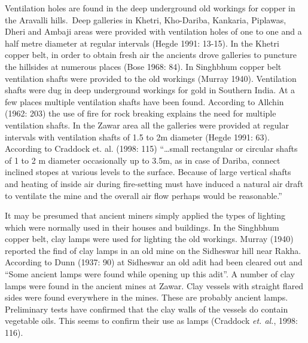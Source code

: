 Ventilation holes are found in the deep underground old workings for copper in the Aravalli hills.~Deep galleries in Khetri, Kho-Dariba, Kankaria, Piplawas, Dheri and Ambaji areas were provided with ventilation holes of one to one and a half metre diameter at regular intervals (Hegde 1991: 13-15). In the Khetri copper belt, in order to obtain fresh air the ancients drove galleries to puncture the hillsides at numerous places (Bose 1968: 84). In Singhbhum copper belt ventilation shafts were provided to the old workings (Murray 1940). Ventilation shafts were dug in deep underground workings for gold in Southern India. At a few places multiple ventilation shafts have been found. According to Allchin (1962: 203) the use of fire for rock breaking explains the need for multiple ventilation shafts. In the Zawar area all the galleries were provided at regular intervals with ventilation shafts of 1.5 to 2m diameter (Hegde 1991: 63). According to Craddock {\rm et. al.} (1998: 115) “…small rectangular or circular shafts of 1 to 2 m diameter occasionally up to 3.5m, as in case of Dariba, connect inclined stopes at various levels to the surface. Because of large vertical shafts and heating of inside air during fire-setting must have induced a natural air draft to ventilate the mine and the overall air flow perhaps would be reasonable.”


It may be presumed that ancient miners simply applied the types of lighting which were normally used in their houses and buildings. In the Singhbhum copper belt, clay lamps were used for lighting the old workings. Murray (1940) reported the find of clay lamps in an old mine on the Sidheswar hill near Rakha. According to Dunn (1937: 90) at Sidheswar an old adit had been cleared out and “Some ancient lamps were found while opening up this adit”. A number of clay lamps were found in the ancient mines at Zawar. Clay vessels with straight flared sides were found everywhere in the mines. These are probably ancient lamps. Preliminary tests have confirmed that the clay walls of the vessels do contain vegetable oils. This seems to confirm their use as lamps (Craddock {\it et. al.}, 1998: 116). 


